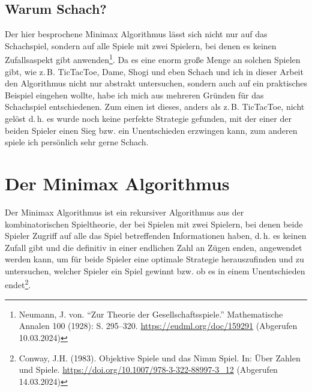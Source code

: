 \documentclass[12pt, a4paper, oneside, openright]{article}
\newcommand \zB{z.\,B.\xspace }
\newcommand \dasheisst{d.\,h.\xspace }
\newcommand \bzw{bzw.\xspace }
\begin{document}
\subsection{Warum Schach?}\label{subsec:warum-schach?}
Der hier besprochene Minimax Algorithmus lässt sich nicht nur auf das Schachspiel, sondern auf alle Spiele mit zwei Spielern, bei denen es keinen Zufallsaspekt gibt anwenden\footnote{Neumann, J. von. \enquote{Zur Theorie der Gesellschaftsspiele.} Mathematische Annalen 100 (1928): S. 295--320. \url{https://eudml.org/doc/159291} (Abgerufen 10.03.2024)}.
Da es eine enorm große Menge an solchen Spielen gibt, wie \zB TicTacToe, Dame, Shogi und eben Schach und ich in dieser Arbeit den Algorithmus nicht nur abstrakt untersuchen, sondern auch auf ein praktisches Beispiel eingehen wollte, habe ich mich aus mehreren Gründen für das Schachspiel entschiedenen.
Zum einen ist dieses, anders als \zB TicTacToe, nicht gelöst \dasheisst es wurde noch keine perfekte Strategie gefunden, mit der einer der beiden Spieler einen Sieg \bzw ein Unentschieden erzwingen kann, zum anderen spiele ich persönlich sehr gerne Schach.

\section{Der Minimax Algorithmus}\label{sec:der-minimax-algorithmus}
Der Minimax Algorithmus ist ein rekursiver Algorithmus aus der kombinatorischen Spieltheorie, der bei Spielen mit zwei Spielern, bei denen beide Spieler Zugriff auf alle das Spiel betreffenden Informationen haben, \dasheisst es keinen Zufall gibt und die definitiv in einer endlichen Zahl an Zügen enden, angewendet werden kann, um für beide Spieler eine optimale Strategie herauszufinden und zu untersuchen, welcher Spieler ein Spiel gewinnt \bzw ob es in einem Unentschieden endet\footnote{Conway, J.H. (1983). Objektive Spiele und das Nimm Spiel. In: Über Zahlen und Spiele. \url{https://doi.org/10.1007/978-3-322-88997-3_12} (Abgerufen 14.03.2024)}.
\end{document}
